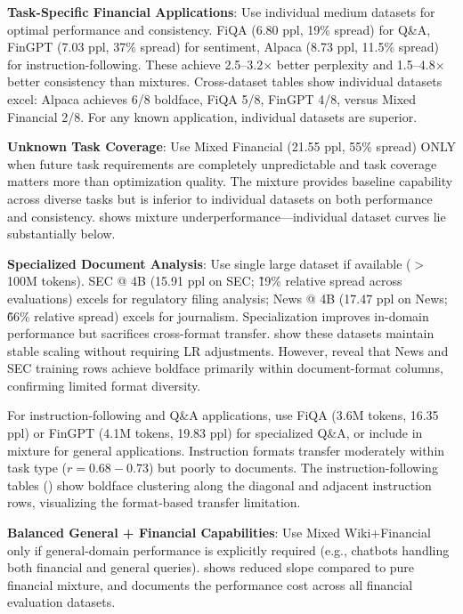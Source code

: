 \textbf{Task-Specific Financial Applications}: Use individual medium datasets for optimal performance and consistency. FiQA (6.80 ppl, 19\% spread) for Q\&A, FinGPT (7.03 ppl, 37\% spread) for sentiment, Alpaca (8.73 ppl, 11.5\% spread) for instruction-following. These achieve 2.5–3.2$\times$ better perplexity and 1.5–4.8$\times$ better consistency than mixtures. Cross-dataset tables show individual datasets excel: Alpaca achieves 6/8 boldface, FiQA 5/8, FinGPT 4/8, versus Mixed Financial 2/8. For any known application, individual datasets are superior.

\textbf{Unknown Task Coverage}: Use Mixed Financial (21.55 ppl, 55\% spread) ONLY when future task requirements are completely unpredictable and task coverage matters more than optimization quality. The mixture provides baseline capability across diverse tasks but is inferior to individual datasets on both performance and consistency.  shows mixture underperformance—individual dataset curves lie substantially below.

\textbf{Specialized Document Analysis}: Use single large dataset if available ($>$ 100M tokens). SEC @ 4B (15.91 ppl on SEC; \~19\% relative spread across evaluations) excels for regulatory filing analysis; News @ 4B (17.47 ppl on News; \~66\% relative spread) excels for journalism. Specialization improves in-domain performance but sacrifices cross-format transfer.  show these datasets maintain stable scaling without requiring LR adjustments. However,  reveal that News and SEC training rows achieve boldface primarily within document-format columns, confirming limited format diversity.

For instruction-following and Q\&A applications, use FiQA (3.6M tokens, 16.35 ppl) or FinGPT (4.1M tokens, 19.83 ppl) for specialized Q\&A, or include in mixture for general applications. Instruction formats transfer moderately within task type ($r = 0.68-0.73$) but poorly to documents. The instruction-following tables () show boldface clustering along the diagonal and adjacent instruction rows, visualizing the format-based transfer limitation.

\textbf{Balanced General + Financial Capabilities}: Use Mixed Wiki+Financial only if general-domain performance is explicitly required (e.g., chatbots handling both financial and general queries).  shows reduced slope compared to pure financial mixture, and  documents the performance cost across all financial evaluation datasets.

